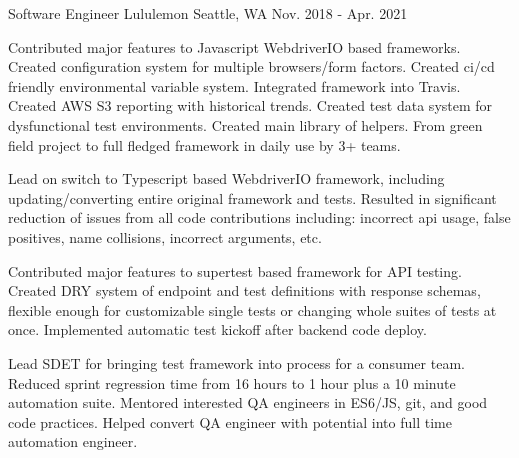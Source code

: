 \begin{cventries}
\cventry
{Software Engineer} %
{Lululemon} %
{Seattle, WA} %
{Nov. 2018 - Apr. 2021} %
{
\begin{cvitems}
\item {Contributed major features to Javascript WebdriverIO based frameworks. Created configuration system for multiple browsers/form factors. Created ci/cd friendly environmental variable system. Integrated framework into Travis. Created AWS S3 reporting with historical trends. Created test data system for dysfunctional test environments. Created main library of helpers. From green field project to full fledged framework in daily use by 3+ teams.}
\item {Lead on switch to Typescript based WebdriverIO framework, including updating/converting entire original framework and tests. Resulted in significant reduction of issues from all code contributions including: incorrect api usage, false positives, name collisions, incorrect arguments, etc.}
\item {Contributed major features to supertest based framework for API testing. Created DRY system of endpoint and test definitions with response schemas, flexible enough for customizable single tests or changing whole suites of tests at once. Implemented automatic test kickoff after backend code deploy.}
\item {Lead SDET for bringing test framework into process for a consumer team. Reduced sprint regression time from 16 hours to 1 hour plus a 10 minute automation suite. Mentored interested QA engineers in ES6/JS, git, and good code practices. Helped convert QA engineer with potential into full time automation engineer.}
\end{cvitems}
}


\end{cventries}
